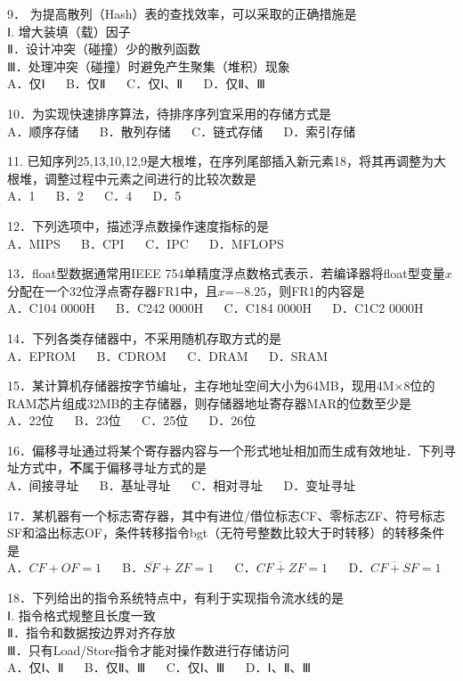 9． 为提高散列（Hash）表的查找效率，可以采取的正确措施是 \\
Ⅰ. 增大装填（载）因子 \\
Ⅱ．设计冲突（碰撞）少的散列函数 \\
Ⅲ．处理冲突（碰撞）时避免产生聚集（堆积）现象 \\
A．仅Ⅰ $\quad$ B．仅Ⅱ $\quad$ C．仅Ⅰ、Ⅱ $\quad$ D．仅Ⅱ、Ⅲ

10．为实现快速排序算法，待排序序列宜采用的存储方式是 \\
A．顺序存储 $\quad$ B．散列存储 $\quad$ C．链式存储 $\quad$ D．索引存储

11. 已知序列25,13,10,12,9是大根堆，在序列尾部插入新元素18，将其再调整为大根堆，调整过程中元素之间进行的比较次数是 \\
A．1 $\quad$  B．2 $\quad$ C．4 $\quad$ D．5

12．下列选项中，描述浮点数操作速度指标的是 \\
A．MIPS $\quad$ B．CPI $\quad$ C．IPC $\quad$ D．MFLOPS

13．float型数据通常用IEEE 754单精度浮点数格式表示．若编译器将float型变量$x$分配在一个$32$位浮点寄存器FR1中，且$x$=$-8.25$，则FR1的内容是 \\
A．C104 0000H $\quad$ B．C242 0000H $\quad$ C．C184 0000H $\quad$ D．C1C2 0000H

14．下列各类存储器中，不采用随机存取方式的是 \\
A．EPROM $\quad$ B．CDROM $\quad$ C．DRAM $\quad$ D．SRAM

15．某计算机存储器按字节编址，主存地址空间大小为64MB，现用4M×8位的RAM芯片组成32MB的主存储器，则存储器地址寄存器MAR的位数至少是 \\
A．22位 $\quad$ B．23位 $\quad$ C．25位 $\quad$ D．26位

16．偏移寻址通过将某个寄存器内容与一个形式地址相加而生成有效地址．下列寻址方式中，\textbf{不}属于偏移寻址方式的是 \\
A．间接寻址 $\quad$ B．基址寻址 $\quad$ C．相对寻址 $\quad$ D．变址寻址

17．某机器有一个标志寄存器，其中有进位/借位标志CF、零标志ZF、符号标志SF和溢出标志OF，条件转移指令bgt（无符号整数比较大于时转移）的转移条件是 \\
A．$CF+OF=1$ $\quad$ B．$\overline{SF}+ZF=1$ $\quad$ C．$\overline{CF+ZF}=1$ $\quad$ D．$\overline{CF+SF}=1$

18．下列给出的指令系统特点中，有利于实现指令流水线的是 \\
Ⅰ. 指令格式规整且长度一致 \\
Ⅱ．指令和数据按边界对齐存放 \\
Ⅲ．只有Load/Store指令才能对操作数进行存储访问 \\
A．仅Ⅰ、Ⅱ $\quad$ B．仅Ⅱ、Ⅲ $\quad$ C．仅Ⅰ、Ⅲ $\quad$ D．Ⅰ、Ⅱ、Ⅲ

